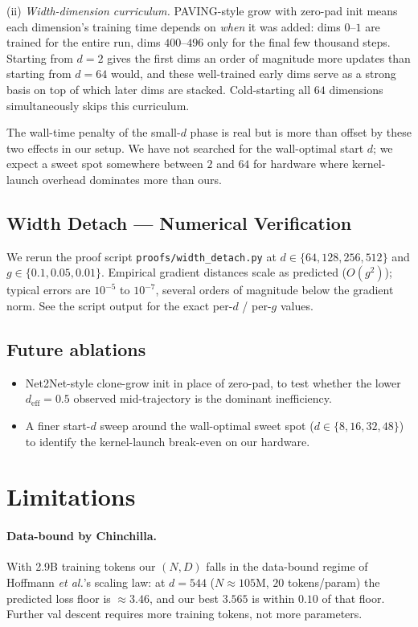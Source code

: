 \documentclass{article}
\begin{document}
(ii) \emph{Width-dimension curriculum.}  PAVING-style grow with
zero-pad init means each dimension's training time depends on
\emph{when} it was added: dims $0$--$1$ are trained for the entire
run, dims $400$--$496$ only for the final few thousand steps.
Starting from $d{=}2$ gives the first dims an order of magnitude
more updates than starting from $d{=}64$ would, and these
well-trained early dims serve as a strong basis on top of which
later dims are stacked.  Cold-starting all $64$ dimensions
simultaneously skips this curriculum.

The wall-time penalty of the small-$d$ phase is real but is more
than offset by these two effects in our setup.  We have not searched
for the wall-optimal start $d$; we expect a sweet spot somewhere
between $2$ and $64$ for hardware where kernel-launch overhead
dominates more than ours.

\subsection{Width Detach --- Numerical Verification}

We rerun the proof script \texttt{proofs/width\_detach.py} at
$d \in \{64, 128, 256, 512\}$ and $g \in \{0.1, 0.05, 0.01\}$.
Empirical gradient distances scale as predicted ($O(g^2)$); typical
errors are $10^{-5}$ to $10^{-7}$, several orders of magnitude below
the gradient norm.  See the script output for the exact per-$d$ /
per-$g$ values.

\subsection{Future ablations}
\label{sec:ablations}

\begin{itemize}
\item Net2Net-style clone-grow init in place of zero-pad, to test
  whether the lower $d_{\text{eff}}{=}0.5$ observed mid-trajectory is
  the dominant inefficiency.
\item A finer start-$d$ sweep around the wall-optimal sweet spot
  ($d \in \{8, 16, 32, 48\}$) to identify the kernel-launch
  break-even on our hardware.
\end{itemize}

\section{Limitations}
\label{sec:limitations}

\paragraph{Data-bound by Chinchilla.}
With 2.9B training tokens our $(N, D)$ falls in the data-bound regime
of Hoffmann \emph{et al.}'s scaling law: at $d{=}544$ ($N \approx
105$M, $20$ tokens/param) the predicted loss floor is $\approx 3.46$,
and our best $3.565$ is within $0.10$ of that floor.  Further val
descent requires more training tokens, not more parameters.
\end{document}
